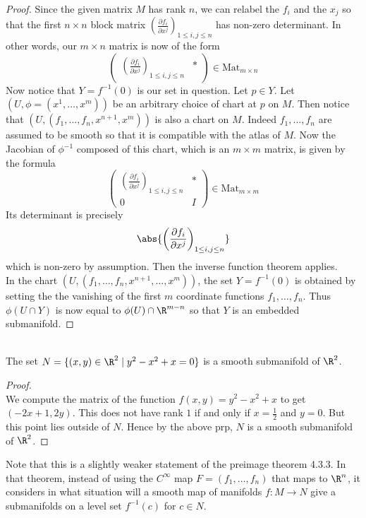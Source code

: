 \documentclass[a4paper]{article}
\begin{document}
\begin{prp}{}{}
\begin{proof}
Since the given matrix $M$ has rank $n$, we can relabel the $f_i$ and the $x_j$ so that the first $n\times n$ block matrix $\left(\frac{\partial f_i}{\partial x^j}\right)_{1\leq i,j\leq n}$ has non-zero determinant. In other words, our $m\times n$ matrix is now of the form $$\begin{pmatrix}
\left(\frac{\partial f_i}{\partial x^j}\right)_{1\leq i,j\leq n} & \ast
\end{pmatrix}\in\text{Mat}_{m\times n}$$ Now notice that $Y=f^{-1}(0)$ is our set in question. Let $p\in Y$. Let $(U,\phi=(x^1,\dots,x^m))$ be an arbitrary choice of chart at $p$ on $M$. Then notice that $(U,(f_1,\dots,f_n,x^{n+1},x^m))$ is also a chart on $M$. Indeed $f_1,\dots,f_n$ are assumed to be smooth so that it is compatible with the atlas of $M$. Now the Jacobian of $\phi^{-1}$ composed of this chart, which is an $m\times m$ matrix, is given by the formula $$\begin{pmatrix}
\left(\frac{\partial f_i}{\partial x^j}\right)_{1\leq i,j\leq n} & \ast\\
0 & I
\end{pmatrix}\in\text{Mat}_{m\times m}$$ Its determinant is precisely $$\abs{\left(\frac{\partial f_i}{\partial x^j}\right)_{1\leq i,j\leq n}}$$ which is non-zero by assumption. Then the inverse function theorem applies. \\

In the chart $(U,(f_1,\dots,f_n,x^{n+1},\dots,x^m))$, the set $Y=f^{-1}(0)$ is obtained by setting the the vanishing of the first $m$ coordinate functions $f_1,\dots,f_n$. Thus $\phi(U\cap Y)$ is now equal to $\phi(U)\cap\R^{m-n}$ so that $Y$ is an embedded submanifold. 
\end{proof}
\end{prp}

\begin{eg}{}{}\\
The set $N=\{(x,y)\in\R^2\;|\;y^2-x^2+x=0\}$ is a smooth submanifold of $\R^2$. 
\begin{proof}\\
We compute the matrix of the function $f(x,y)=y^2-x^2+x$ to get $(-2x+1,2y)$. This does not have rank $1$ if and only if $x=\frac{1}{2}$ and $y=0$. But this point lies outside of $N$. Hence by the above prp, $N$ is a smooth submanifold of $\R^2$. 
\end{proof}
\end{eg}

Note that this is a slightly weaker statement of the preimage theorem 4.3.3. In that theorem, instead of using the $C^\infty$ map $F=(f_1,\dots,f_n)$ that maps to $\R^n$, it considers in what situation will a smooth map of manifolds $f:M\to N$ give a submanifolds on a level set $f^{-1}(c)$ for $c\in N$. 
\end{document}
